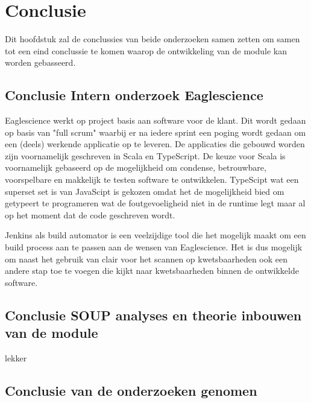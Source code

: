 
\chapter{Conclusie} %

\label{ch:onderzoekConclusie} %

Dit hoofdstuk zal de conclussies van beide onderzoeken samen zetten om samen tot een eind conclussie te komen waarop de ontwikkeling van de module kan worden gebasseerd.

\section{Conclusie Intern onderzoek Eaglescience}
Eaglescience werkt op project basis aan software voor de klant. Dit wordt gedaan op basis van "full scrum" waarbij er na iedere sprint een poging wordt gedaan om een (deels) werkende applicatie op te leveren. De applicaties die gebouwd worden zijn voornamelijk geschreven in Scala en TypeScript. De keuze voor Scala is voornamelijk gebaseerd op de mogelijkheid om condense, betrouwbare, voorspelbare en makkelijk te testen software te ontwikkelen. TypeScipt wat een superset set is van JavaScipt is gekozen omdat het de mogelijkheid bied om getypeert te programeren wat de foutgevoeligheid niet in de runtime legt maar al op het moment dat de code geschreven wordt.

Jenkins als build automator is een veelzijdige tool die het mogelijk maakt om een build process aan te passen aan de wensen van Eaglescience. Het is dus mogelijk om naast het gebruik van clair voor het scannen op kwetsbaarheden ook een andere stap toe te voegen die kijkt naar kwetsbaarheden binnen de ontwikkelde software.

\section{Conclusie SOUP analyses en theorie inbouwen van de module}
lekker
\lipsum[01]

\section{Conclusie van de onderzoeken genomen} %
